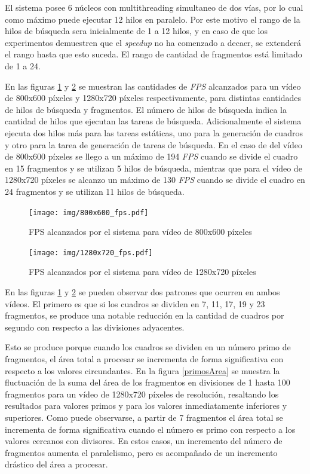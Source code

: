El sistema posee 6 núcleos con multithreading simultaneo de dos vías, por lo
cual como máximo puede ejecutar 12 hilos en paralelo. Por este motivo el rango
de la hilos de búsqueda sera inicialmente de 1 a 12 hilos, y en caso de que los
experimentos demuestren que el \emph{speedup} no ha comenzado a decaer, se
extenderá el rango hasta que esto suceda. El rango de cantidad de fragmentos
está limitado de 1 a 24.

En las figuras \ref{800fps} y \ref{1280fps} se muestran las cantidades de
\emph{FPS} alcanzados para un vídeo de 800x600 píxeles y 1280x720 píxeles
respectivamente, para distintas cantidades de hilos de búsqueda y fragmentos.
El número de hilos de búsqueda indica la cantidad de hilos que ejecutan las
tareas de búsqueda. Adicionalmente el sistema ejecuta dos hilos más para las
tareas estáticas, uno para la generación de cuadros y otro para la tarea de
generación de tareas de búsqueda. En el caso de del vídeo de 800x600 píxeles se
llego a un máximo de 194 \emph{FPS} cuando se divide el cuadro en 15 fragmentos
y se utilizan 5 hilos de búsqueda, mientras que para el vídeo de 1280x720
píxeles se alcanzo un máximo de 130 \emph{FPS} cuando se divide el cuadro en 24
fragmentos y se utilizan 11 hilos de búsqueda.

\begin{figure}[h]

	\texttt{[image: img/800x600\_fps.pdf]}
	\caption{FPS alcanzados por el sistema para vídeo de 800x600 píxeles}
	\label{800fps}

\end{figure}

\begin{figure}[h]

	\texttt{[image: img/1280x720\_fps.pdf]}
	\caption{FPS alcanzados por el sistema para vídeo de 1280x720 píxeles}
	\label{1280fps}

\end{figure}

En las figuras \ref{800fps} y \ref{1280fps} se pueden observar dos patrones que
ocurren en ambos vídeos. El primero es que si los cuadros se dividen en 7, 11,
17, 19 y 23 fragmentos, se produce una notable reducción en la cantidad de
cuadros por segundo con respecto a las divisiones adyacentes.

Esto se produce porque cuando los cuadros se dividen en un número primo de
fragmentos, el área total a procesar se incrementa de forma significativa con
respecto a los valores circundantes. En la figura \ref{primosArea} se muestra la
fluctuación de la suma del área de los fragmentos en divisiones de 1 hasta 100
fragmentos para un vídeo de 1280x720 píxeles de resolución, resaltando los
resultados para valores primos y para los valores inmediatamente inferiores y
superiores. Como puede observarse, a partir de 7 fragmentos el área total se
incrementa de forma significativa cuando el número es primo con respecto a los
valores cercanos con divisores. En estos casos, un incremento del número
de fragmentos aumenta el paralelismo, pero es acompañado de un incremento
drástico del área a procesar.


